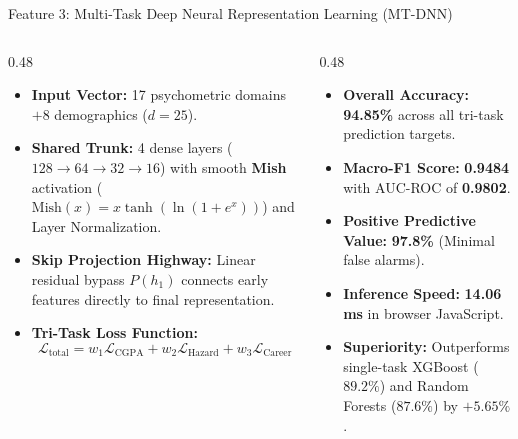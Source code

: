 \documentclass[aspectratio=169,10pt]{beamer}
\newcommand{\howbox}[2]{
  \begin{tcolorbox}[colframe=howframe,colbacktitle=howframe,colback=howbg,title=\textbf{HOW? The Technology \& Algorithms (#1)}]
  \scriptsize #2
  \end{tcolorbox}
}
\newcommand{\outbox}[2]{
  \begin{tcolorbox}[colframe=outframe,colbacktitle=outframe,colback=outbg,title=\textbf{OUTCOMES? Measurable Impact \& Results (#1)}]
  \scriptsize #2
  \end{tcolorbox}
}
\begin{document}
\begin{frame}{Feature 3: Multi-Task Deep Neural Representation Learning (MT-DNN)}
\begin{columns}[T]
\begin{column}{0.48\textwidth}
\howbox{Neural Trunk Architecture}{
\begin{itemize}
    \item \textbf{Input Vector:} 17 psychometric domains $+ 8$ demographics ($d=25$).
    \item \textbf{Shared Trunk:} 4 dense layers ($128 \rightarrow 64 \rightarrow 32 \rightarrow 16$) with smooth \textbf{Mish} activation ($\text{Mish}(x) = x \tanh(\ln(1+e^x))$) and Layer Normalization.
    \item \textbf{Skip Projection Highway:} Linear residual bypass $P(h_1)$ connects early features directly to final representation.
    \item \textbf{Tri-Task Loss Function:}
    $$\mathcal{L}_{\text{total}} = w_1 \mathcal{L}_{\text{CGPA}} + w_2 \mathcal{L}_{\text{Hazard}} + w_3 \mathcal{L}_{\text{Career}}$$
\end{itemize}
}
\end{column}

\begin{column}{0.48\textwidth}
\outbox{Empirical Performance Benchmarks}{
\begin{itemize}
    \item \textbf{Overall Accuracy:} \textbf{94.85\%} across all tri-task prediction targets.
    \item \textbf{Macro-F1 Score:} \textbf{0.9484} with AUC-ROC of \textbf{0.9802}.
    \item \textbf{Positive Predictive Value:} \textbf{97.8\%} (Minimal false alarms).
    \item \textbf{Inference Speed:} \textbf{14.06 ms} in browser JavaScript.
    \item \textbf{Superiority:} Outperforms single-task XGBoost ($89.2\%$) and Random Forests ($87.6\%$) by $+5.65\%$.
\end{itemize}
}
\end{column}
\end{columns}
\end{frame}
\end{document}
